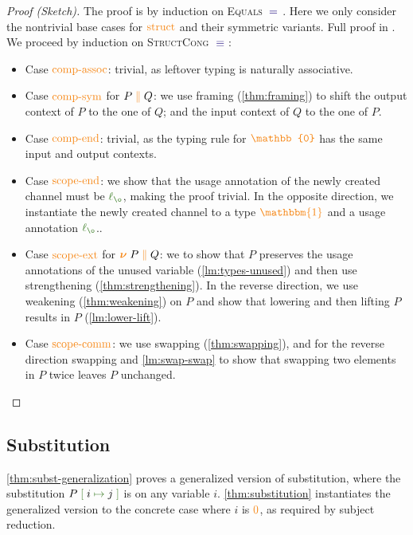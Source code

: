 \documentclass[a4paper,UKenglish,cleveref,autoref,thm-restate,authorcolumns]{lipics-v2019}
\theoremstyle{definition}
\newcommand{\type}[1]{\textcolor{BlueViolet}{\operatorname{#1}}}
\newcommand{\constr}[1]{\textcolor{BurntOrange}{\operatorname{#1}}}
\newcommand{\func}[1]{\textcolor{OliveGreen}{\operatorname{#1}}}
\newcommand{\PO}{\constr{\mathbb{0}}}
\newcommand{\comp}[2]{#1 \; \constr{\parallel} \; #2}
\newcommand{\new}{\constr{\boldsymbol{\nu}} \;}
\newcommand{\unit}{\constr{\mathbbm{1}}}
\newcommand{\subst}[3]{#1 \; \func{[} \; #3 \; \func{\mapsto} \;#2 \; \func{]}}
\newcommand{\lz}{\func{\ell_{\o}}}
\newcommand{\eq}[1]{\; \type{=}_{#1} \;}
\newcommand{\eqeq}{\; \type{\equiv} \;}
\begin{document}
\begin{proof}[Proof (Sketch)]
  The proof is by induction on \textsc{Equals} $\eq{}$.
  Here we only consider the nontrivial base cases for $\constr{struct}$ and their symmetric variants.
  Full proof in \cite{Zalakain2020Agda}.
  We proceed by induction on \textsc{StructCong} $\eqeq$:
  \begin{itemize}
    \item
      Case $\constr{comp-assoc}$: trivial, as leftover typing is naturally associative.
    \item
      Case $\constr{comp-sym}$ for $\comp{P}{Q}$: we use framing (\autoref{thm:framing}) to shift the output context of $P$ to the one of $Q$; and the input context of $Q$ to the one of $P$.
    \item
      Case $\constr{comp-end}$: trivial, as the typing rule for $\PO$ has the same input and output contexts.
    \item
      Case $\constr{scope-end}$: we show that the usage annotation of the newly created channel must be $\lz$, making the proof trivial.
      In the opposite direction, we instantiate the newly created channel to a type $\unit$ and a usage annotation $\lz$..
    \item
      Case $\constr{scope-ext}$ for $\new \comp{P}{Q}$: we to show that $P$ preserves the usage annotations of the unused variable (\autoref{lm:types-unused}) and then use strengthening (\autoref{thm:strengthening}).
      In the reverse direction, we use weakening (\autoref{thm:weakening}) on $P$ and show that lowering and then lifting $P$ results in $P$ (\autoref{lm:lower-lift}).
    \item
      Case $\constr{scope-comm}$:
      we use swapping (\autoref{thm:swapping}), and for the reverse direction swapping and \autoref{lm:swap-swap} to show that swapping two elements in $P$ twice leaves $P$ unchanged. \qedhere
  \end{itemize}
\end{proof}
\subsection{Substitution}
\label{substitution}
\autoref{thm:subst-generalization} proves a generalized version of substitution, where the substitution $\subst{P}{j}{i}$ is on any variable $i$.
\autoref{thm:substitution} instantiates the generalized version to the concrete case where $i$ is $\constr{0}$, as required by subject reduction.
\end{document}
